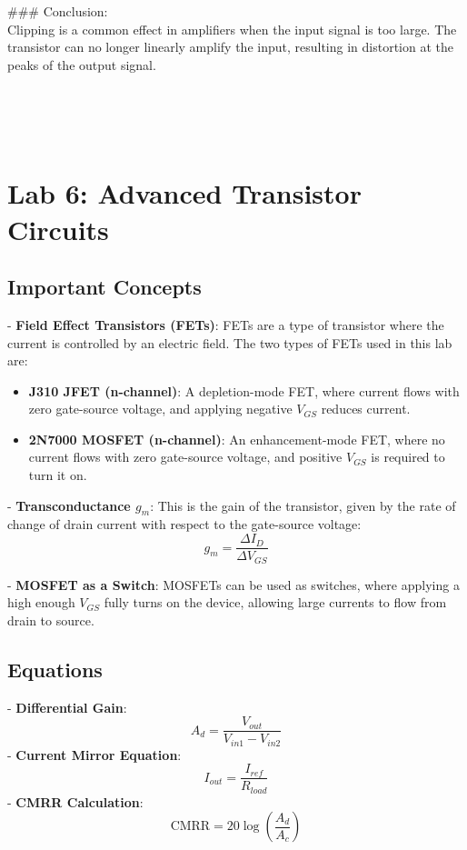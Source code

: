 \documentclass{article}
\begin{document}
### Conclusion: \\ 
Clipping is a common effect in amplifiers when the input signal is too large. The transistor can no longer linearly amplify the input, resulting in distortion at the peaks of the output signal.



\\ \\ \\ 
\section*{Lab 6: Advanced Transistor Circuits}

\subsection*{Important Concepts}
- \textbf{Field Effect Transistors (FETs)}: FETs are a type of transistor where the current is controlled by an electric field. The two types of FETs used in this lab are:
  \begin{itemize}
    \item \textbf{J310 JFET (n-channel)}: A depletion-mode FET, where current flows with zero gate-source voltage, and applying negative \( V_{GS} \) reduces current.
    \item \textbf{2N7000 MOSFET (n-channel)}: An enhancement-mode FET, where no current flows with zero gate-source voltage, and positive \( V_{GS} \) is required to turn it on.
  \end{itemize}

- \textbf{Transconductance \( g_m \)}: This is the gain of the transistor, given by the rate of change of drain current with respect to the gate-source voltage:
\[
g_m = \frac{\Delta I_D}{\Delta V_{GS}}
\]

- \textbf{MOSFET as a Switch}: MOSFETs can be used as switches, where applying a high enough \( V_{GS} \) fully turns on the device, allowing large currents to flow from drain to source.

\subsection*{Equations}
- \textbf{Differential Gain}:
  \[
  A_d = \frac{V_{out}}{V_{in1} - V_{in2}}
  \]
- \textbf{Current Mirror Equation}:
  \[
  I_{out} = \frac{I_{ref}}{R_{load}}
  \]
- \textbf{CMRR Calculation}:
  \[
  \text{CMRR} = 20 \log \left( \frac{A_d}{A_c} \right)
  \]
\end{document}
